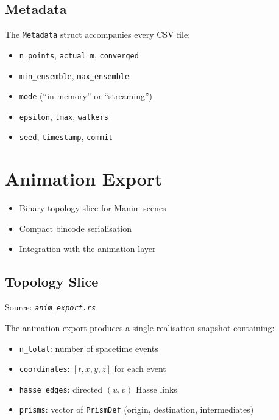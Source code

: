 \documentclass[11pt, a4paper, openany]{book}
\newcommand{\code}[1]{\texttt{#1}}
\newcommand{\file}[1]{\texttt{\itshape #1}}
\newenvironment{introduction}[1][Chapter Overview]{%
  \begin{tcolorbox}[
    enhanced,colback=structure!5,colframe=structure,
    colbacktitle=structure,coltitle=white,
    fonttitle=\small\bfseries,title={#1},
    arc=2pt,boxrule=0.7pt,
    left=8pt,right=8pt,top=6pt,bottom=6pt,
    before skip=12pt,after skip=12pt
  ]\itshape\begin{itemize}[leftmargin=*,itemsep=2pt,parsep=0pt]
}{%
  \end{itemize}\end{tcolorbox}
}
\begin{document}
\section{Metadata}

The \code{Metadata} struct accompanies every CSV file:
\begin{itemize}
  \item \code{n\_points}, \code{actual\_m}, \code{converged}
  \item \code{min\_ensemble}, \code{max\_ensemble}
  \item \code{mode} (``in-memory'' or ``streaming'')
  \item \code{epsilon}, \code{tmax}, \code{walkers}
  \item \code{seed}, \code{timestamp}, \code{commit}
\end{itemize}


\chapter{Animation Export}

\begin{introduction}
  \item Binary topology slice for Manim scenes
  \item Compact bincode serialisation
  \item Integration with the animation layer
\end{introduction}

\section{Topology Slice}

Source: \file{anim\_export.rs}

The animation export produces a single-realisation snapshot containing:

\begin{definition}[TopologySlice]
  \begin{itemize}
    \item \code{n\_total}: number of spacetime events
    \item \code{coordinates}: $[t, x, y, z]$ for each event
    \item \code{hasse\_edges}: directed $(u, v)$ Hasse links
    \item \code{prisms}: vector of \code{PrismDef} (origin, destination,
          intermediates)
  \end{itemize}
\end{definition}
\end{document}
